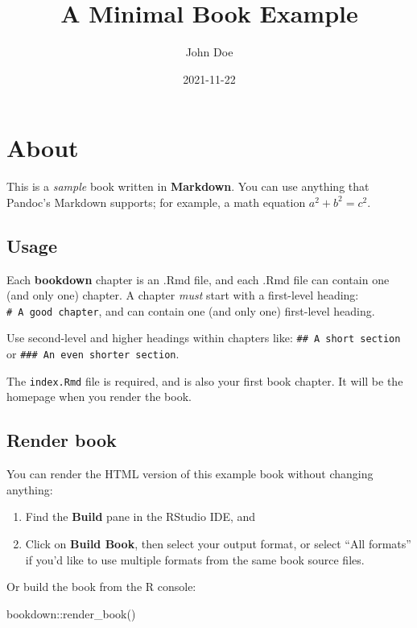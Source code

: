 \documentclass[
]{book}
\title{A Minimal Book Example}
\author{John Doe}
\date{2021-11-22}
\newenvironment{Shaded}{\begin{snugshade}}{\end{snugshade}}
\newcommand{\FunctionTok}[1]{\textcolor[rgb]{0.00,0.00,0.00}{#1}}
\newcommand{\NormalTok}[1]{#1}
\newcommand{\SpecialCharTok}[1]{\textcolor[rgb]{0.00,0.00,0.00}{#1}}
\begin{document}
\maketitle

{
\setcounter{tocdepth}{1}
\tableofcontents
}
\hypertarget{about}{%
\chapter{About}\label{about}}

This is a \emph{sample} book written in \textbf{Markdown}. You can use anything that Pandoc's Markdown supports; for example, a math equation \(a^2 + b^2 = c^2\).

\hypertarget{usage}{%
\section{Usage}\label{usage}}

Each \textbf{bookdown} chapter is an .Rmd file, and each .Rmd file can contain one (and only one) chapter. A chapter \emph{must} start with a first-level heading: \texttt{\#\ A\ good\ chapter}, and can contain one (and only one) first-level heading.

Use second-level and higher headings within chapters like: \texttt{\#\#\ A\ short\ section} or \texttt{\#\#\#\ An\ even\ shorter\ section}.

The \texttt{index.Rmd} file is required, and is also your first book chapter. It will be the homepage when you render the book.

\hypertarget{render-book}{%
\section{Render book}\label{render-book}}

You can render the HTML version of this example book without changing anything:

\begin{enumerate}
\def\labelenumi{\arabic{enumi}.}
\item
  Find the \textbf{Build} pane in the RStudio IDE, and
\item
  Click on \textbf{Build Book}, then select your output format, or select ``All formats'' if you'd like to use multiple formats from the same book source files.
\end{enumerate}

Or build the book from the R console:

\begin{Shaded}
\begin{Highlighting}[]
\NormalTok{bookdown}\SpecialCharTok{::}\FunctionTok{render\_book}\NormalTok{()}
\end{Highlighting}
\end{Shaded}
\end{document}
